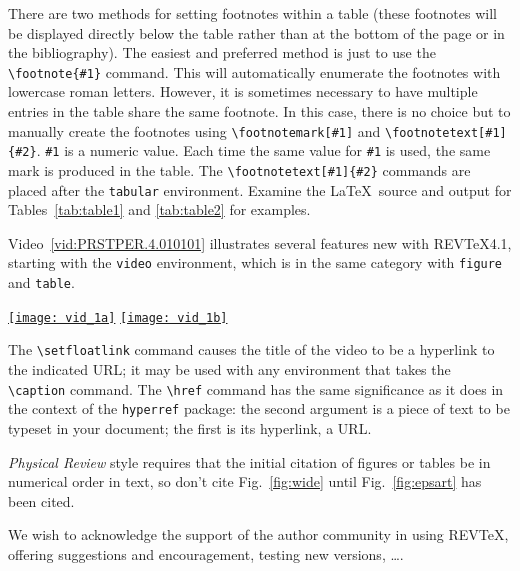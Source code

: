 \documentclass[%
 reprint,
 amsmath,amssymb,
 aps,
]{revtex4-1}
\begin{document}
There are two methods for setting footnotes within a table (these
footnotes will be displayed directly below the table rather than at
the bottom of the page or in the bibliography). The easiest
and preferred method is just to use the \verb+\footnote{#1}+
command. This will automatically enumerate the footnotes with
lowercase roman letters. However, it is sometimes necessary to have
multiple entries in the table share the same footnote. In this case,
there is no choice but to manually create the footnotes using
\verb+\footnotemark[#1]+ and \verb+\footnotetext[#1]{#2}+.
\texttt{\#1} is a numeric value. Each time the same value for
\texttt{\#1} is used, the same mark is produced in the table. The
\verb+\footnotetext[#1]{#2}+ commands are placed after the \texttt{tabular}
environment. Examine the \LaTeX\ source and output for
Tables~\ref{tab:table1} and \ref{tab:table2}
for examples.

Video~\ref{vid:PRSTPER.4.010101} 
illustrates several features new with REV\TeX4.1,
starting with the \texttt{video} environment, which is in the same category with
\texttt{figure} and \texttt{table}.%
\begin{video}
\href{http://prst-per.aps.org/multimedia/PRSTPER/v4/i1/e010101/e010101_vid1a.mpg}{\texttt{[image: vid\_1a]}}%
 \quad
\href{http://prst-per.aps.org/multimedia/PRSTPER/v4/i1/e010101/e010101_vid1b.mpg}{\texttt{[image: vid\_1b]}}
 \caption{\label{vid:PRSTPER.4.010101}%
  Students explain their initial idea about Newton's third law to a teaching assistant. 
  Clip (a): same force.
  Clip (b): move backwards.
 }%
\end{video}
The \verb+\setfloatlink+ command causes the title of the video to be a hyperlink to the
indicated URL; it may be used with any environment that takes the \verb+\caption+
command.
The \verb+\href+ command has the same significance as it does in the context of
the \texttt{hyperref} package: the second argument is a piece of text to be 
typeset in your document; the first is its hyperlink, a URL.

\textit{Physical Review} style requires that the initial citation of
figures or tables be in numerical order in text, so don't cite
Fig.~\ref{fig:wide} until Fig.~\ref{fig:epsart} has been cited.

\begin{acknowledgments}
We wish to acknowledge the support of the author community in using
REV\TeX{}, offering suggestions and encouragement, testing new versions,
\dots.
\end{acknowledgments}
\end{document}
